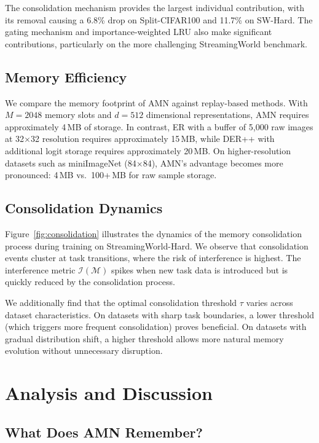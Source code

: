 \documentclass[11pt]{article}
\begin{document}
The consolidation mechanism provides the largest individual contribution, with its removal causing a 6.8\% drop on Split-CIFAR100 and 11.7\% on SW-Hard. The gating mechanism and importance-weighted LRU also make significant contributions, particularly on the more challenging StreamingWorld benchmark.

\subsection{Memory Efficiency}

We compare the memory footprint of AMN against replay-based methods. With $M = 2048$ memory slots and $d = 512$ dimensional representations, AMN requires approximately 4\,MB of storage. In contrast, ER with a buffer of 5,000 raw images at 32$\times$32 resolution requires approximately 15\,MB, while DER++ with additional logit storage requires approximately 20\,MB. On higher-resolution datasets such as miniImageNet (84$\times$84), AMN's advantage becomes more pronounced: 4\,MB vs.\ 100+\,MB for raw sample storage.

\subsection{Consolidation Dynamics}

Figure~\ref{fig:consolidation} illustrates the dynamics of the memory consolidation process during training on StreamingWorld-Hard. We observe that consolidation events cluster at task transitions, where the risk of interference is highest. The interference metric $\mathcal{I}(\mathcal{M})$ spikes when new task data is introduced but is quickly reduced by the consolidation process.

We additionally find that the optimal consolidation threshold $\tau$ varies across dataset characteristics. On datasets with sharp task boundaries, a lower threshold (which triggers more frequent consolidation) proves beneficial. On datasets with gradual distribution shift, a higher threshold allows more natural memory evolution without unnecessary disruption.

\section{Analysis and Discussion}
\label{sec:analysis}

\subsection{What Does AMN Remember?}
\end{document}
